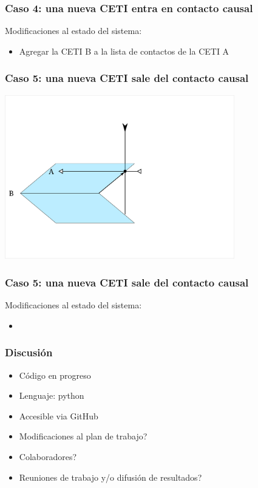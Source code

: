 \documentclass[handout]{beamer}
\theoremstyle{plain}
\theoremstyle{definition}
\theoremstyle{remark}
\begin{document}
\begin{frame}\frametitle{Caso 4: una nueva CETI entra en contacto causal}

   Modificaciones al estado del sistema:
   \begin{itemize}
      \item  Agregar la CETI B a la lista de contactos de la CETI A
   \end{itemize}

\end{frame}  %
 
 
\begin{frame}\frametitle{Caso 5: una nueva CETI sale del contacto causal}
   \centering
   \includegraphics[width=0.75\textwidth]{C5.png}
\end{frame}  %

\begin{frame}\frametitle{Caso 5: una nueva CETI sale del contacto causal}

   Modificaciones al estado del sistema:
   \begin{itemize}
      \item 
   \end{itemize}

\end{frame}  %
 


 
\begin{frame}\frametitle{Discusión}
   \begin{itemize}
      \item Código en progreso
      \item Lenguaje: python
      \item Accesible via GitHub
      \item Modificaciones al plan de trabajo?
      \item Colaboradores?
      \item Reuniones de trabajo y/o difusión de resultados?
   \end{itemize}
\end{frame}
\end{document}
